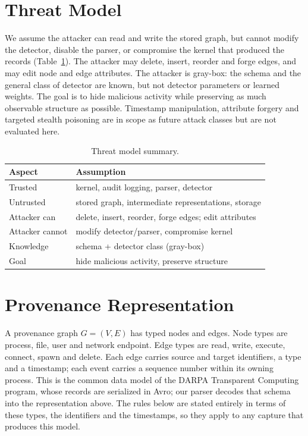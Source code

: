 \documentclass[journal]{IEEEtran}
\begin{document}
\section{Threat Model}
We assume the attacker can read and write the stored graph, but cannot modify
the detector, disable the parser, or compromise the kernel that produced the
records (Table~\ref{tab:threat}). The attacker may delete, insert, reorder and
forge edges, and may edit node and edge attributes. The attacker is gray-box:
the schema and the general class of detector are known, but not detector
parameters or learned weights. The goal is to hide malicious activity while
preserving as much observable structure as possible. Timestamp manipulation,
attribute forgery and targeted stealth poisoning are in scope as future attack
classes but are not evaluated here.

\begin{table}[t]
\centering
\small
\caption{Threat model summary.}
\label{tab:threat}
\begin{tabular}{p{3.0cm}p{5.0cm}}
\toprule
Aspect & Assumption \\
\midrule
Trusted & kernel, audit logging, parser, detector \\
Untrusted & stored graph, intermediate representations, storage \\
Attacker can & delete, insert, reorder, forge edges; edit attributes \\
Attacker cannot & modify detector/parser, compromise kernel \\
Knowledge & schema + detector class (gray-box) \\
Goal & hide malicious activity, preserve structure \\
\bottomrule
\end{tabular}
\end{table}

\section{Provenance Representation}
A provenance graph $G=(V,E)$ has typed nodes and edges. Node types are process,
file, user and network endpoint. Edge types are read, write, execute, connect,
spawn and delete. Each edge carries source and target identifiers, a type and a
timestamp; each event carries a sequence number within its owning process. This
is the common data model of the DARPA Transparent Computing program, whose
records are serialized in Avro; our parser decodes that schema into the
representation above. The rules below are stated entirely in terms of these
types, the identifiers and the timestamps, so they apply to any capture that
produces this model.
\end{document}
